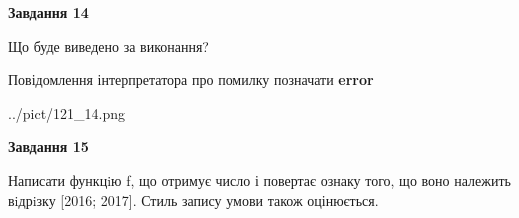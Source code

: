 \documentclass[11pt, ukrainian]{article}
\begin{document}
{\begin {large}
{\begin {center}\textbf{Завдання 14}\end {center}}\par
Що буде виведено за виконання? \par
Повідомлення інтерпретатора про помилку позначати \textbf{error}

\begin{center}
	{../pict/121_14.png}
\end{center}
\newpage

{\begin {center}\textbf{Завдання 15}\end {center}}\par

Написати функцiю f, що отримує число і повертає ознаку того, що воно належить вiдрiзку [2016; 2017]. Стиль запису умови також оцінюється.\par
\newpage

\end {large}}
\end{document}
